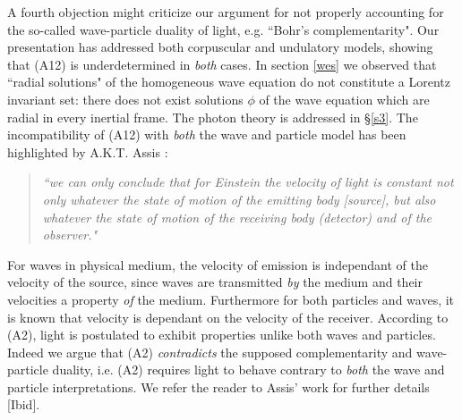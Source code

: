 \documentclass[12pt]{amsart}
\begin{document}
A fourth objection might criticize our argument for not properly accounting for the so-called wave-particle duality of light, e.g. ``Bohr's complementarity". Our presentation has addressed both corpuscular and undulatory models, showing that (A12) is underdetermined in \emph{both} cases. In section \ref{wes} we observed that ``radial solutions" of the homogeneous wave equation do not constitute a Lorentz invariant set: there does not exist solutions $\phi$ of the wave equation which are radial in every inertial frame. The photon theory is addressed in \S \ref{s3}. The incompatibility of (A12) with \emph{both} the wave and particle model has been highlighted by A.K.T. Assis \cite[\S 7.2.4, pp.133]{assis1999relational}:  
\begin{quote} \emph{``we can only conclude that for Einstein the velocity of light is constant not only whatever the state of motion of the emitting body [source], but also whatever the state of motion of the receiving body (detector) and of the observer."} 
\end{quote}
For waves in physical medium, the velocity of emission is independant of the velocity of the source, since waves are transmitted \emph{by} the medium and their velocities a property \emph{of} the medium. Furthermore for both particles and waves, it is known that velocity is dependant on the velocity of the receiver. According to (A2), light is postulated to exhibit properties unlike both waves and particles. Indeed we argue that (A2) \emph{contradicts} the supposed complementarity and wave-particle duality, i.e.  (A2) requires light to behave contrary to \emph{both} the wave and particle interpretations. We refer the reader to Assis' work for further details [Ibid].












\end{document}
